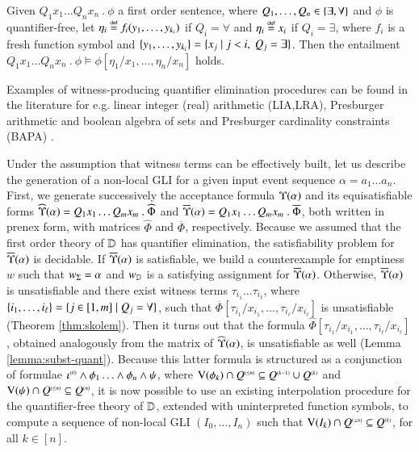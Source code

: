 \begin{theorem}\label{thm:skolem}
  Given $Q_1 x_1 \ldots Q_n x_n ~.~ \phi$ a first order sentence,
  where $Q_1, \ldots, Q_n \in \{ \exists,\forall \}$ and $\phi$ is
  quantifier-free, let $\eta_i \stackrel{\scriptscriptstyle{\mathsf{def}}}{=} f_i(y_1,\ldots,y_{k_i})$ if $Q_i
  = \forall$ and $\eta_i \stackrel{\scriptscriptstyle{\mathsf{def}}}{=} x_i$ if $Q_i = \exists$, where $f_i$
  is a fresh function symbol and $\{ y_1, \ldots, y_{k_i} \} =
  \{ x_j \mid j < i,~ Q_j = \exists \}$. Then the entailment \(Q_1 x_1
  \ldots Q_n x_n ~.~ \phi \models \phi[\eta_1/x_1,\ldots,\eta_n/x_n]\)
  holds.
\end{theorem}

Examples of witness-producing quantifier elimination procedures can be
found in the literature for e.g. linear integer (real) arithmetic
(LIA,LRA), Presburger arithmetic and boolean algebra of sets and
Presburger cardinality constraints (BAPA)
\cite{KuncakMayerPiskacSuter12}.  


Under the assumption that witness terms can be effectively built, let
us describe the generation of a non-local GLI for a given input event
sequence $\alpha = a_1 \ldots a_n$. First, we generate successively
the acceptance formula $\Upsilon({\alpha})$ and its equisatisfiable
forms $\widehat{\Upsilon}({\alpha}) = Q_1x_1 \ldots Q_mx_m ~.~ \widehat{\Phi}$
and $\overline{\Upsilon}({\alpha}) = Q_1x_1 \ldots Q_mx_m ~.~ \overline{\Phi}$,
both written in prenex form, with matrices $\widehat{\Phi}$ and
$\overline{\Phi}$, respectively. Because we assumed that the
first order theory of $\mathbb{D}$ has quantifier elimination, the
satisfiability problem for $\overline{\Upsilon}({\alpha})$ is decidable. If
$\overline{\Upsilon}({\alpha})$ is satisfiable, we build a counterexample for
emptiness $w$ such that ${w}_\Sigma=\alpha$ and ${w}_{\mathbb{D}}$ is a
satisfying assignment for $\overline{\Upsilon}({\alpha})$. Otherwise,
$\overline{\Upsilon}({\alpha})$ is unsatisfiable and there exist witness terms
$\tau_{i_1} \ldots \tau_{i_\ell}$, where $\{ i_1, \ldots, i_\ell \} =
\{ j \in [1,m] \mid Q_j = \forall \}$, such that
$\overline{\Phi}[\tau_{i_1}/x_{i_1}, \ldots,
  \tau_{i_\ell}/x_{i_\ell}]$ is unsatisfiable (Theorem
\ref{thm:skolem}). Then it turns out that the formula
$\widehat{\Phi}[\tau_{i_1}/x_{i_1}, \ldots,
  \tau_{i_\ell}/x_{i_\ell}]$, obtained analogously from the matrix of
$\widehat{\Upsilon}({\alpha})$, is unsatisfiable as well (Lemma
\ref{lemma:subst-quant}). Because this latter formula is structured as
a conjunction of formulae ${\iota}^{\scriptscriptstyle{({0})}} \wedge \phi_1 \ldots
\wedge \phi_n \wedge \psi$, where $\mathrm{V}({\phi_k}) \cap {Q}^{\scriptscriptstyle{({\leq n})}}
\subseteq {Q}^{\scriptscriptstyle{({k-1})}} \cup {Q}^{\scriptscriptstyle{({k})}}$ and $\mathrm{V}({\psi}) \cap
{Q}^{\scriptscriptstyle{({\leq n})}} \subseteq {Q}^{\scriptscriptstyle{({n})}}$, it is now possible to use
an existing interpolation procedure for the quantifier-free theory of
$\mathbb{D}$, extended with uninterpreted function symbols, to compute a
sequence of non-local GLI $(I_0, \ldots, I_n)$ such that $\mathrm{V}({I_k})
\cap {Q}^{\scriptscriptstyle{({\leq n})}} \subseteq {Q}^{\scriptscriptstyle{({k})}}$, for all $k \in [n]$.

